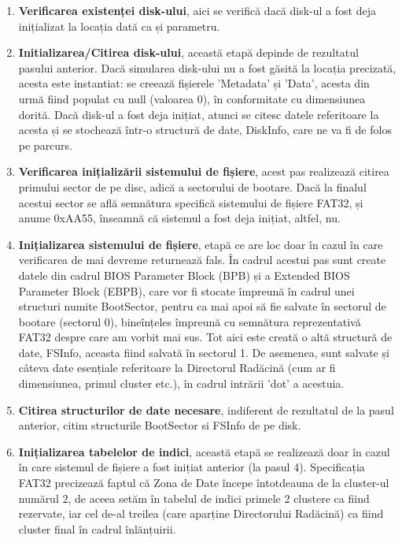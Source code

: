 \begin{enumerate}
  \item \textbf{Verificarea existenței disk-ului}, aici se verifică dacă disk-ul a fost deja inițializat la locația dată ca și parametru.

  \item \textbf{Initializarea/Citirea disk-ului}, această etapă depinde de rezultatul pasului anterior. Dacă simularea disk-ului nu a fost găsită la locația precizată, acesta este instantiat: se creează fișierele 'Metadata' și 'Data', acesta din urmă fiind populat cu null (valoarea 0), în conformitate cu dimensiunea dorită. Dacă disk-ul a fost deja inițiat, atunci se citesc datele referitoare la acesta și se stochează într-o structură de date, DiskInfo, care ne va fi de folos pe parcurs.

  \item \textbf{Verificarea inițializării sistemului de fișiere}, acest pas realizează citirea primului sector de pe disc, adică a sectorului de bootare. Dacă la finalul acestui sector se află semnătura specifică sistemului de fișiere FAT32, și anume 0xAA55, înseamnă că sistemul a fost deja inițiat, altfel, nu.

  \item \textbf{Inițializarea sistemului de fișiere}, etapă ce are loc doar în cazul în care verificarea de mai devreme returnează fals. În cadrul acestui pas sunt create datele din cadrul BIOS Parameter Block (BPB) și a Extended BIOS Parameter Block (EBPB), care vor fi stocate împreună în cadrul unei structuri numite BootSector, pentru ca mai apoi să fie salvate în sectorul de bootare (sectorul 0), bineînțeles împreună cu semnătura reprezentativă FAT32 despre care am vorbit mai sus. Tot aici este creată o altă structură de date, FSInfo, aceasta fiind salvată în sectorul 1. De asemenea, sunt salvate și câteva date esențiale referitoare la Directorul Radăcină (cum ar fi dimensiunea, primul cluster etc.), în cadrul intrării 'dot' a acestuia.

  \item \textbf{Citirea structurilor de date necesare}, indiferent de rezultatul de la pasul anterior, citim structurile BootSector si FSInfo de pe disk.

  \item \textbf{Inițializarea tabelelor de indici}, această etapă se realizează doar în cazul în care sistemul de fișiere a fost inițiat anterior (la pasul 4). Specificația FAT32 precizează faptul că Zona de Date începe întotdeauna de la cluster-ul numărul 2, de aceea setăm în tabelul de indici primele 2 clustere ca fiind rezervate, iar cel de-al treilea (care aparține Directorului Radăcină) ca fiind cluster final în cadrul înlănțuirii.
  
\end{enumerate}

